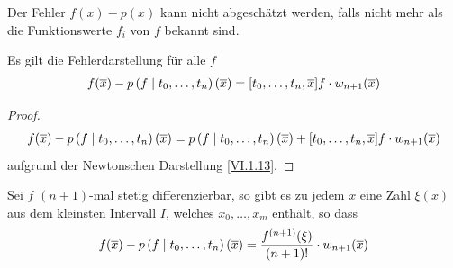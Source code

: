Der Fehler $f(x) -p(x) $ kann nicht abgeschätzt werden,
falls nicht mehr als die Funktionswerte $f_i$ von $f$ bekannt sind.

\begin{Satze}
  Es gilt die Fehlerdarstellung für alle $f$
  \begin{gather}
    f(\overline{x})-p\left( f \mid t_0,\dotsc,t_n \right)(\overline{x})
    = [t_0,\dotsc,t_n,\overline{x}]f\cdot w_{n+1}(\overline{x})
    \label{VI.1.22}
  \end{gather}
\end{Satze}

\begin{proof}
  \begin{gather*}
    f(\overline{x})- p\left( f \mid t_0,\dotsc,t_n \right)(\overline{x})
    = p\left( f \mid t_0,\dotsc,t_n \right)(\overline{x})
    + [t_0,\dotsc,t_n,\overline{x}]f\cdot w_{n+1}(\overline{x})
  \end{gather*}
  aufgrund der Newtonschen Darstellung \eqref{VI.1.13}.
\end{proof}


\begin{Satze}[Restglieddarstellung]
  Sei $f$ $(n+1)$-mal stetig differenzierbar,
  so gibt es zu jedem $\overline{x}$ eine Zahl $\xi(\overline{x})$
  aus dem kleinsten Intervall $I$, welches $x_0,\dotsc, x_m$ enthält,
  so dass 
  \begin{gather}
    f(\overline{x})-p\left( f \mid t_0,\dotsc,t_n \right)(\overline{x})
    = \frac{f^{(n+1)}(\xi)}{(n+1)!}\cdot w_{n+1}(\overline{x})
    \label{VI.1.21}
  \end{gather}
\end{Satze}

